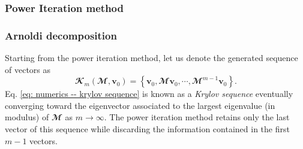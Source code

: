     \subsubsection{Power Iteration method}
    \label{subsubsec: numerics -- power iteration}

    \subsubsection{Arnoldi decomposition}
    \label{subsubsec: numerics -- arnoldi}

    Starting from the power iteration method, let us denote the generated sequence of vectors as
    \begin{equation}
      \mathbfcal{K}_m\left( \mathbfcal{M}, \mathbf{v}_0 \right) = \left\{ \mathbf{v}_0, \mathbfcal{M}\mathbf{v}_0, \cdots, \mathbfcal{M}^{m-1} \mathbf{v}_0 \right\}.
      \label{eq: numerics -- krylov sequence}
    \end{equation}
    Eq. \eqref{eq: numerics -- krylov sequence} is known as a \emph{Krylov sequence} eventually converging toward the eigenvector associated to the largest eigenvalue (in modulus) of $\mathbfcal{M}$ as $m \to \infty$. The power iteration method retains only the last vector of this sequence while discarding the information contained in the first $m-1$ vectors.

